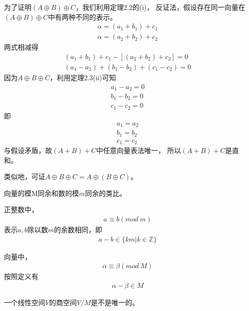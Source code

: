 \documentclass{article}
\begin{document}
\begin{itemize}
        为了证明$(A \oplus B) \oplus C$，我们利用定理2.2的(i)，
        反证法，假设存在同一向量在$(A \oplus B) \oplus C$中有两种不同的表示。
        \begin{align*}
          \alpha = (a_1 + b_1) + c_1 \\
          \alpha = (a_2 + b_2) + c_2
        \end{align*}
        两式相减得
        \begin{align*}
          (a_1 + b_1) + c_1 - [(a_2 + b_2) + c_2] = 0 \\
          (a_1 - a_2) + (b_1 - b_2) + (c_1 - c_2) = 0
        \end{align*}
        因为$A \oplus B \oplus C$，利用定理2.3(ii)可知
        \begin{align*}
          a_1 - a_2 = 0 \\
          b_1 - b_2 = 0 \\
          c_1 - c_2 = 0
        \end{align*}
        即
        \begin{align*}
          a_1 = a_2 \\
          b_1 = b_2 \\
          c_1 = c_2
        \end{align*}
        与假设矛盾，故$(A + B) + C$中任意向量表法唯一，
        所以$(A + B) + C$是直和。
\end{itemize}
类似地，可证$A \oplus B \oplus C = A \oplus (B \oplus C)$。

\begin{zremark}
  向量的模M同余和数的模$m$同余的类比。
\end{zremark}

正整数中，
\begin{align*}
  a \equiv b (mod \ m)
\end{align*}
表示$a,b$除以数$m$的余数相同，即
\begin{align*}
  a - b \in \{km | k \in \mathbb{Z}\}
\end{align*}

向量中，
\begin{align*}
  \alpha \equiv \beta (mod \ M)
\end{align*}
按照定义有
\begin{align*}
  \alpha - \beta \in M
\end{align*}

\begin{zremark}
  一个线性空间$V$的商空间$V/M$是不是唯一的。
\end{zremark}
\end{document}
